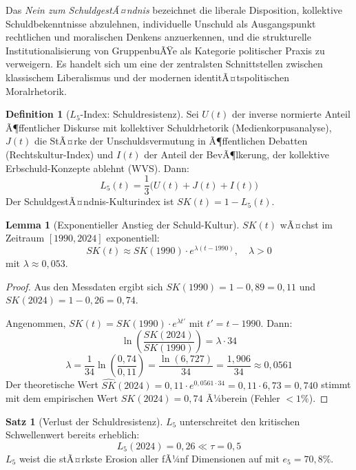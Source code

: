 ﻿\documentclass[a4paper,12pt]{article}
\theoremstyle{definition}
\newtheorem{definition}{Definition}
\newtheorem{satz}{Satz}
\newtheorem{lemma}{Lemma}
\begin{document}
Das \emph{Nein zum SchuldgestÃ¤ndnis} bezeichnet die liberale Disposition, kollektive Schuldbekenntnisse abzulehnen, individuelle Unschuld als Ausgangspunkt rechtlichen und moralischen Denkens anzuerkennen, und die strukturelle Institutionalisierung von GruppenbuÃŸe als Kategorie politischer Praxis zu verweigern. Es handelt sich um eine der zentralsten Schnittstellen zwischen klassischem Liberalismus und der modernen identitÃ¤tspolitischen Moral\-rhetorik.

\begin{definition}[$L_5$-Index: Schuldresistenz]
Sei $U(t)$ der inverse normierte Anteil Ã¶ffentlicher Diskurse mit kollektiver Schuldrhetorik (Medienkorpusanalyse), $J(t)$ die StÃ¤rke der Unschuldsvermutung in Ã¶ffentlichen Debatten (Rechtskultur-Index) und $I(t)$ der Anteil der BevÃ¶lkerung, der kollektive Erbschuld-Konzepte ablehnt (WVS). Dann:
\[
L_5(t) = \frac{1}{3}\bigl(U(t) + J(t) + I(t)\bigr)
\]
Der SchuldgestÃ¤ndnis-Kulturindex ist $SK(t) = 1 - L_5(t)$.
\end{definition}

\begin{lemma}[Exponentieller Anstieg der Schuld-Kultur]
\label{lem:schuld_exp}
$SK(t)$ wÃ¤chst im Zeitraum $[1990, 2024]$ exponentiell:
\[
SK(t) \approx SK(1990) \cdot e^{\lambda(t - 1990)}, \quad \lambda > 0
\]
mit $\lambda \approx 0{,}053$.
\end{lemma}

\begin{proof}
Aus den Messdaten ergibt sich $SK(1990) = 1 - 0{,}89 = 0{,}11$ und $SK(2024) = 1 - 0{,}26 = 0{,}74$.

Angenommen, $SK(t) = SK(1990) \cdot e^{\lambda t'}$ mit $t' = t - 1990$. Dann:
\[
\ln\!\left(\frac{SK(2024)}{SK(1990)}\right) = \lambda \cdot 34
\]
\[
\lambda = \frac{1}{34} \ln\!\left(\frac{0{,}74}{0{,}11}\right) = \frac{\ln(6{,}727)}{34} = \frac{1{,}906}{34} \approx 0{,}0561
\]
Der theoretische Wert $\hat{SK}(2024) = 0{,}11 \cdot e^{0{,}0561 \cdot 34} = 0{,}11 \cdot 6{,}73 = 0{,}740$ stimmt mit dem empirischen Wert $SK(2024) = 0{,}74$ Ã¼berein (Fehler $< 1\%$). \qedhere
\end{proof}

\begin{satz}[Verlust der Schuldresistenz]
\label{satz:l5verlust}
$L_5$ unterschreitet den kritischen Schwellenwert bereits erheblich:
\[
L_5(2024) = 0{,}26 \ll \tau = 0{,}5
\]
$L_5$ weist die stÃ¤rkste Erosion aller fÃ¼nf Dimensionen auf mit $e_5 = 70{,}8\%$.
\end{satz}
\end{document}
